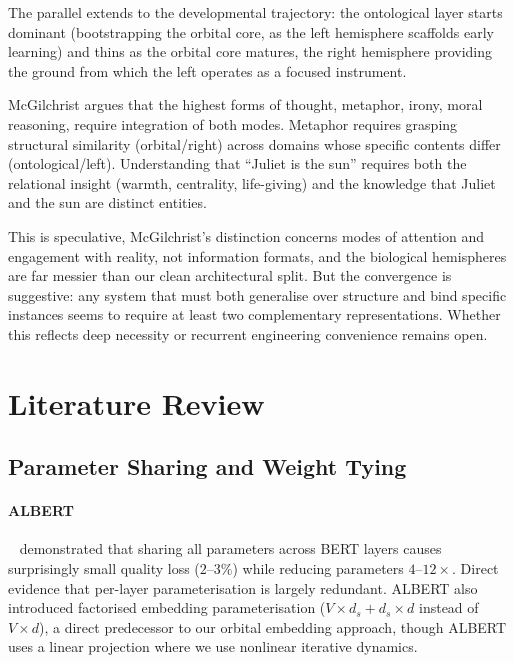 \documentclass[11pt, a4paper]{article}
\theoremstyle{remark}
\begin{document}
The parallel extends to the developmental trajectory: the ontological layer starts dominant (bootstrapping the orbital core, as the left hemisphere scaffolds early learning) and thins as the orbital core matures, the right hemisphere providing the ground from which the left operates as a focused instrument.

McGilchrist argues that the highest forms of thought, metaphor, irony, moral reasoning, require integration of both modes.
Metaphor requires grasping structural similarity (orbital/right) across domains whose specific contents differ (ontological/left).
Understanding that ``Juliet is the sun'' requires both the relational insight (warmth, centrality, life-giving) and the knowledge that Juliet and the sun are distinct entities.

This is speculative, McGilchrist's distinction concerns modes of attention and engagement with reality, not information formats, and the biological hemispheres are far messier than our clean architectural split.
But the convergence is suggestive: any system that must both generalise over structure and bind specific instances seems to require at least two complementary representations.
Whether this reflects deep necessity or recurrent engineering convenience remains open.


\section{Literature Review}
\label{sec:literature}

\subsection{Parameter Sharing and Weight Tying}

\paragraph{ALBERT}~\cite{lan2020albert} demonstrated that sharing all parameters across BERT layers causes surprisingly small quality loss ($2$--$3\%$) while reducing parameters $4$--$12\times$.
Direct evidence that per-layer parameterisation is largely redundant.
ALBERT also introduced factorised embedding parameterisation ($V \times d_s + d_s \times d$ instead of $V \times d$), a direct predecessor to our orbital embedding approach, though ALBERT uses a linear projection where we use nonlinear iterative dynamics.
\end{document}
